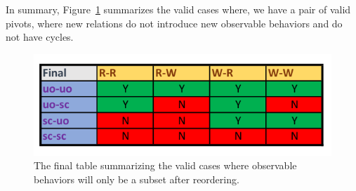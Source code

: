    In summary, Figure~\ref{reord:final_table} summarizes the valid cases where, we have a pair of valid pivots, where new relations do not introduce new observable behaviors and do not have cycles. 
    \begin{figure}[H]
        \centering
        \includegraphics[scale=0.7]{5.InstructionReordering/4.ValidReorderingCandidate/part4_table.pdf}
        \caption{The final table summarizing the valid cases where observable behaviors will only be a subset after reordering.}
        \label{reord:final_table}
    \end{figure}
